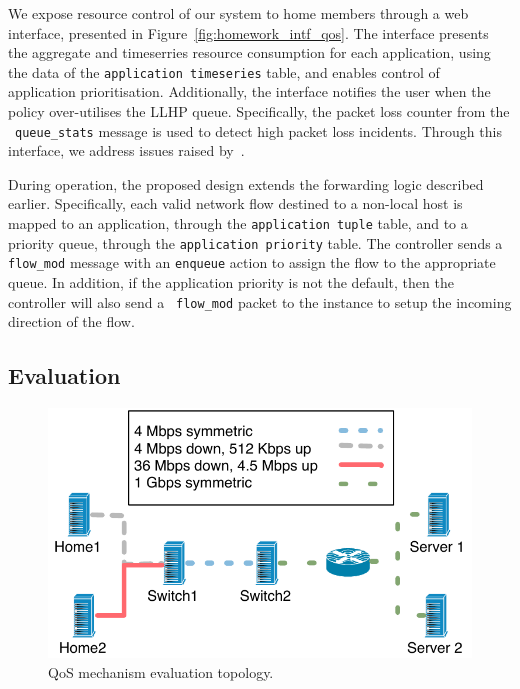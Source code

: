 We expose resource control of our system to home members through a web
interface, presented in Figure~\ref{fig:homework_intf_qos}.  The interface
presents the aggregate and timeserries resource consumption for each
application, using the data of the \texttt{application timeseries} table, and
enables control of application prioritisation. Additionally, the interface
notifies the user when the policy over-utilises the LLHP queue.  Specifically,
the packet loss counter from the \of~{\tt queue\_stats} message is used to detect 
high packet loss incidents.  Through this interface, we
address issues raised by~. 

During operation, the proposed design extends the forwarding logic described
earlier. Specifically, each valid network flow destined to a non-local host is
mapped to an application, through the \texttt{application tuple} table,  and to
a priority queue, through the \texttt{application priority} table. The
controller sends a {\tt flow\_mod} message with an {\tt enqueue} action to
assign the flow to the appropriate queue. In addition, if the application
priority is not the default, then the controller will also send a {\tt
flow\_mod} packet to the \flv instance to setup the incoming direction of
the flow. 

\subsection{Evaluation} \label{s:qos:eval}

\begin{figure}
  \centering
  \includegraphics[width=0.6\columnwidth]{queue_eval_setup}
  \caption{\label{fig:queue_eval_setup} QoS mechanism evaluation topology.}
\end{figure}


